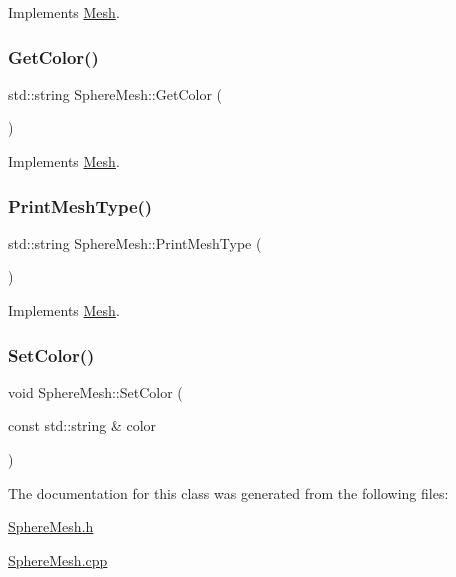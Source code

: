 Implements \mbox{\hyperlink{class_mesh_a11928acab4066671d10e9e531ad96fb6}{Mesh}}.

\mbox{\label{class_sphere_mesh_a1c490b89552f51b7960dc760ac09edf8}} 
\subsubsection{\texorpdfstring{GetColor()}{GetColor()}}
{\footnotesize\ttfamily std\+::string Sphere\+Mesh\+::\+Get\+Color (\begin{DoxyParamCaption}{ }\end{DoxyParamCaption})\hspace{0.3cm}{\ttfamily [virtual]}}



Implements \mbox{\hyperlink{class_mesh_aa413c0ccbc081aa50a2946e1c6930b0c}{Mesh}}.

\mbox{\label{class_sphere_mesh_ad40fa08f33e72acf0410c2ce6099ca4c}} 
\subsubsection{\texorpdfstring{PrintMeshType()}{PrintMeshType()}}
{\footnotesize\ttfamily std\+::string Sphere\+Mesh\+::\+Print\+Mesh\+Type (\begin{DoxyParamCaption}{ }\end{DoxyParamCaption})\hspace{0.3cm}{\ttfamily [virtual]}}



Implements \mbox{\hyperlink{class_mesh_a0d34fc4317a5e3bc2437b610141b9109}{Mesh}}.

\mbox{\label{class_sphere_mesh_a8e9e0a923060501e12f278508ac96f13}} 
\subsubsection{\texorpdfstring{SetColor()}{SetColor()}}
{\footnotesize\ttfamily void Sphere\+Mesh\+::\+Set\+Color (\begin{DoxyParamCaption}\item[{const std\+::string \&}]{color }\end{DoxyParamCaption})}



The documentation for this class was generated from the following files\+:\begin{DoxyCompactItemize}
\item 
\mbox{\hyperlink{_sphere_mesh_8h}{Sphere\+Mesh.\+h}}\item 
\mbox{\hyperlink{_sphere_mesh_8cpp}{Sphere\+Mesh.\+cpp}}\end{DoxyCompactItemize}
